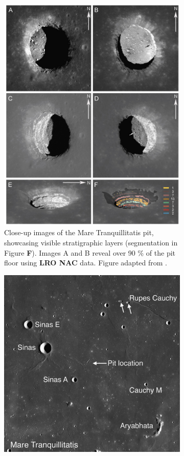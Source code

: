\begin{figure}[h!]
    \centering
    \begin{subfigure}[c]{0.59\linewidth}
        \centering
        \includegraphics[width=0.9\linewidth]{lunar-pits-with-layers.png}
        \caption{Close-up images of the Mare Tranquillitatis pit, showcasing visible stratigraphic layers (segmentation in Figure \textbf{F}). Images A and B reveal over 90 \% of the pit floor using \textbf{LRO NAC} data. Figure adapted from \cite{sublunear-lava}.}
        \label{fig:image1}
    \end{subfigure}
    \hfill
    \begin{subfigure}[c]{0.4\linewidth}
        \centering
        \includegraphics[width=0.9\linewidth]{Lunar_Pit_layers_2pic_location.png}

\end{subfigure}
\end{figure}
